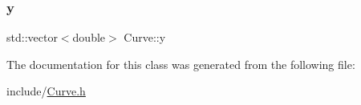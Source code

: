 \mbox{\label{class_curve_a81ad07dc5dccb7a05870b6341ae78364}} 
\subsubsection{\texorpdfstring{y}{y}}
{\footnotesize\ttfamily std\+::vector$<$double$>$ Curve\+::y\hspace{0.3cm}{\ttfamily [protected]}}



The documentation for this class was generated from the following file\+:\begin{DoxyCompactItemize}
\item 
include/\hyperlink{_curve_8h}{Curve.\+h}\end{DoxyCompactItemize}
